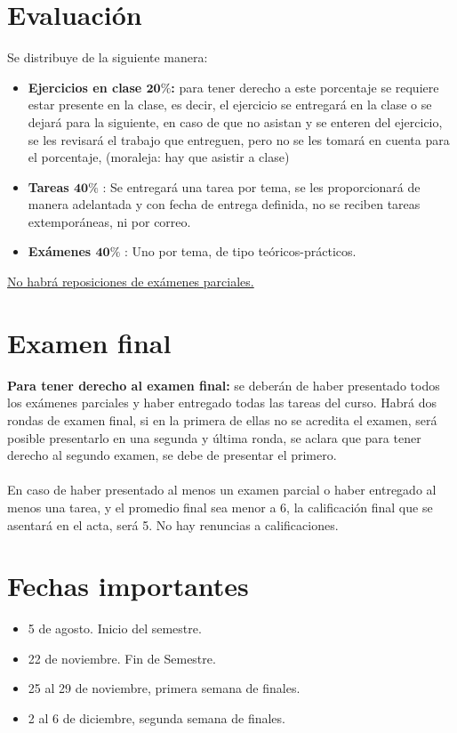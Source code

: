 \documentclass[12pt]{article}
\begin{document}
\section{Evaluaci\'{o}n}
Se distribuye de la siguiente manera:
\begin{itemize}
\item \textbf{Ejercicios en clase $\mathbf{20\%}$:} para tener derecho a este porcentaje se requiere estar presente en la clase, es decir, el ejercicio se entregar\'{a} en la clase o se dejar\'{a} para la siguiente, en caso de que no asistan y se enteren del ejercicio, se les revisar\'{a} el trabajo que entreguen, pero no se les tomar\'{a} en cuenta para el porcentaje, (moraleja: hay que asistir a clase) 
\item \textbf{Tareas $\mathbf{40\%}$} : Se entregar\'{a} una tarea por tema, se les proporcionar\'{a} de manera adelantada y con fecha de entrega definida, no se reciben tareas extempor\'{a}neas, ni por correo.
\item \textbf{Ex\'{a}menes $\mathbf{40\%}$} : Uno por tema, de tipo teóricos-pr\'{a}cticos. 
\end{itemize}
\underline{No habr\'{a} reposiciones de ex\'{a}menes parciales.}
\section{Examen final}
\textbf{Para tener derecho al examen final:} se deber\'{a}n de haber presentado todos los ex\'{a}menes parciales y haber entregado todas las tareas del curso. Habr\'{a} dos rondas de examen final, si en la primera de ellas no se acredita el examen, ser\'{a} posible presentarlo en una segunda y \'{u}ltima ronda, se aclara que para tener derecho al segundo examen, se debe de presentar el primero.
\\
\\
En caso de haber presentado al menos un examen parcial o haber entregado al menos una tarea, y el promedio final sea menor a 6, la calificación final que se asentar\'{a} en el acta, ser\'{a} 5. No hay renuncias a calificaciones.
\section{Fechas importantes}
\begin{itemize}
\item 5 de agosto. Inicio del semestre.
\item 22 de noviembre. Fin de Semestre.
\item 25 al 29 de noviembre, primera semana de finales.
\item 2 al 6 de diciembre, segunda semana de finales.
\end{itemize}
\end{document}
